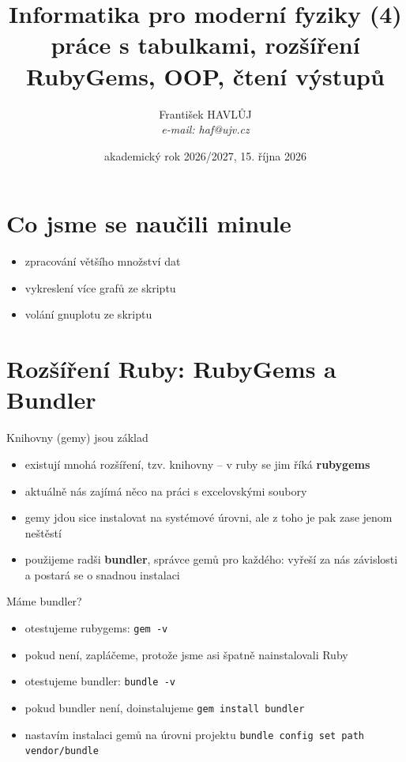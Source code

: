 \documentclass{beamer}
\title[IMF (4)]{Informatika pro moderní fyziky (4)\\práce s tabulkami, rozšíření RubyGems, OOP, čtení výstupů}
\author[Franti\v{s}ek HAVL\r{U}J, ORF ÚJV Řež]{Franti\v{s}ek HAVL\r{U}J\\{\scriptsize \emph{e-mail: haf@ujv.cz}}}
\date{akademický rok 2026/2027, 15. října 2026}
\institute[ORF ÚJV Řež]
{ÚJV Řež\\oddělení Reaktorové fyziky a podpory palivového cyklu}
\begin{document}
\begin{frame}
  \titlepage
\end{frame}

\begin{frame}
  \tableofcontents
\end{frame}

\section{Co jsme se naučili minule}

\begin{frame}{}
  \begin{itemize}
    \item zpracování většího množství dat
    \item vykreslení více grafů ze skriptu
    \item volání gnuplotu ze skriptu  
  \end{itemize}
\end{frame}

\section{Rozšíření Ruby: RubyGems a Bundler}

\begin{frame}{Knihovny (gemy) jsou základ}
  \begin{itemize}
    \item existují mnohá rozšíření, tzv. knihovny -- v ruby se jim říká \textbf{rubygems}
    \item aktuálně nás zajímá něco na práci s excelovskými soubory
    \item gemy jdou sice instalovat na systémové úrovni, ale z toho je pak zase jenom neštěstí
    \item použijeme radši \textbf{bundler}, správce gemů pro každého: vyřeší za nás závislosti a postará se o snadnou instalaci
  \end{itemize}
\end{frame}

\begin{frame}{Máme bundler?}
  \begin{itemize}
    \item otestujeme rubygems: \texttt{gem -v}
    \item pokud není, zapláčeme, protože jsme asi špatně nainstalovali Ruby
    \item otestujeme bundler: \texttt{bundle -v}
    \item pokud bundler není, doinstalujeme \texttt{gem install bundler}
    \item nastavím instalaci gemů na úrovni projektu \texttt{bundle config set path vendor/bundle}
  \end{itemize}
\end{frame}
\end{document}
